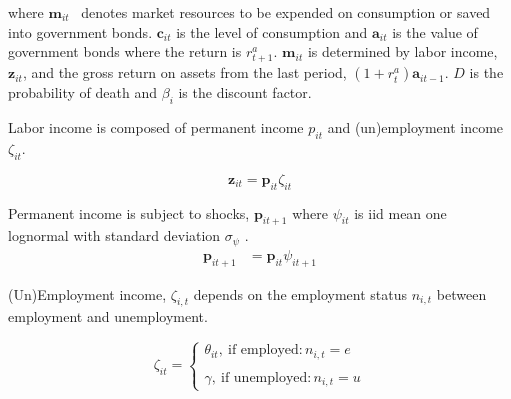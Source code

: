 where
 $\mathbf{m}_{it}$ \ denotes market resources to be expended on consumption or saved into government bonds. $\mathbf{c}_{it}$ is the level of consumption and $ \mathbf{a}_{it}$ is the value of government bonds where the return is $r_{t+1}^{a}$.  $\mathbf{m}_{it}$ is determined by labor income,  $\mathbf{z}_{it}$, and the gross return on assets from the last period, $(1+r_{t}^{a}) \mathbf{a}_{it-1} $. $D$ is the probability of death and $\beta_{i}$ is the discount factor.


Labor income is composed of permanent income $p_{it}$ and (un)employment income $\zeta_{it}$.

$$\mathbf{z}_{it} = \mathbf{p}_{it}\zeta_{it}$$

Permanent income is subject to shocks, $\mathbf{p}_{it+1}$ where $\psi_{it}$ is iid mean one lognormal with standard deviation $\sigma_\psi$ .
\begin{align*}
\mathbf{p}_{it+1} &=\mathbf{p}_{it} \psi_{it+1} 
\end{align*}




(Un)Employment income, $\zeta_{i,t}$ depends on the employment status $n_{i,t}$ between employment and unemployment.   

$$
\zeta _{it} =
\begin{cases}
\theta_{it} , \  \text{if employed}  : n_{i,t}=e\\ \\
\gamma, \  \text{if unemployed}: n_{i,t}=u  %
\end{cases}
$$ 

